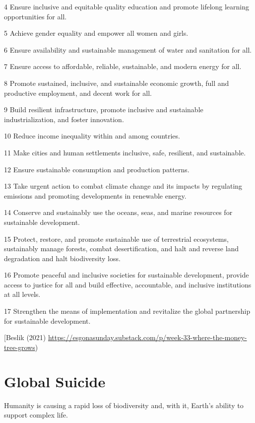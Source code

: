 \documentclass[
]{book}
\begin{document}
4 Ensure inclusive and equitable quality education and promote lifelong learning opportunities for all.

5 Achieve gender equality and empower all women and girls.

6 Ensure availability and sustainable management of water and sanitation for all.

7 Ensure access to affordable, reliable, sustainable, and modern energy for all.

8 Promote sustained, inclusive, and sustainable economic growth, full and productive employment, and decent work for all.

9 Build resilient infrastructure, promote inclusive and sustainable industrialization, and foster innovation.

10 Reduce income inequality within and among countries.

11 Make cities and human settlements inclusive, safe, resilient, and sustainable.

12 Ensure sustainable consumption and production patterns.

13 Take urgent action to combat climate change and its impacts by regulating emissions and promoting developments in renewable energy.

14 Conserve and sustainably use the oceans, seas, and marine resources for sustainable development.

15 Protect, restore, and promote sustainable use of terrestrial ecosystems, sustainably manage forests, combat desertification, and halt and reverse land degradation and halt biodiversity loss.

16 Promote peaceful and inclusive societies for sustainable development, provide access to justice for all and build effective, accountable, and inclusive institutions at all levels.

17 Strengthen the means of implementation and revitalize the global partnership for sustainable development.

{[}Beslik (2021) \url{https://esgonasunday.substack.com/p/week-33-where-the-money-tree-grows})

\hypertarget{global-suicide}{%
\section{Global Suicide}\label{global-suicide}}

Humanity is causing a rapid loss of biodiversity and,
with it, Earth's ability to support complex life.
\end{document}
